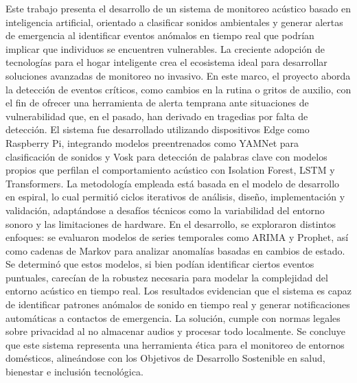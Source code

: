 Este trabajo presenta el desarrollo de un sistema de monitoreo acústico basado en inteligencia artificial, orientado a clasificar sonidos ambientales y generar alertas de emergencia al identificar eventos anómalos en tiempo real que podrían implicar que individuos se encuentren vulnerables. La creciente adopción de tecnologías para el hogar inteligente crea el ecosistema ideal para desarrollar soluciones avanzadas de monitoreo no invasivo. En este marco, el proyecto aborda la detección de eventos críticos, como cambios en la rutina o gritos de auxilio, con el fin de ofrecer una herramienta de alerta temprana ante situaciones de vulnerabilidad que, en el pasado, han derivado en tragedias por falta de detección. El sistema fue desarrollado utilizando dispositivos Edge como Raspberry Pi, integrando modelos preentrenados como YAMNet para clasificación de sonidos y Vosk para detección de palabras clave con modelos propios que perfilan el comportamiento acústico con Isolation Forest, LSTM y Transformers. La metodología empleada está basada en el modelo de desarrollo en espiral, lo cual permitió ciclos iterativos de análisis, diseño, implementación y validación, adaptándose a desafíos técnicos como la variabilidad del entorno sonoro y las limitaciones de hardware. En el desarrollo, se exploraron distintos enfoques: se evaluaron modelos de series temporales como ARIMA y Prophet, así como cadenas de Markov para analizar anomalías basadas en cambios de estado. Se determinó que estos modelos, si bien podían identificar ciertos eventos puntuales, carecían de la robustez necesaria para modelar la complejidad del entorno acústico en tiempo real. Los resultados evidencian que el sistema es capaz de identificar patrones anómalos de sonido en tiempo real y generar notificaciones automáticas a contactos de emergencia. La solución, cumple con normas legales sobre privacidad al no almacenar audios y procesar todo localmente. Se concluye que este sistema representa una herramienta ética para el monitoreo de entornos domésticos, alineándose con los Objetivos de Desarrollo Sostenible en salud, bienestar e inclusión tecnológica.

